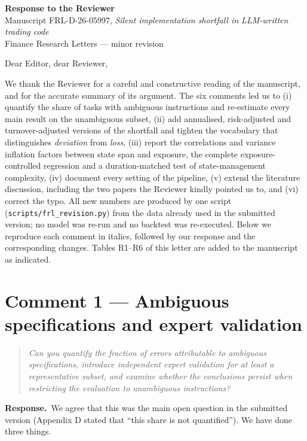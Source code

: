 \documentclass[11pt,a4paper]{article}
\newenvironment{reviewer}{\par\medskip\noindent\begin{quote}\itshape}{\end{quote}\par}
\newcommand{\response}{\par\noindent\textbf{Response.}\ }
\begin{document}
\begin{center}
{\large\bfseries Response to the Reviewer}\\[4pt]
Manuscript FRL-D-26-05997, \emph{Silent implementation shortfall in LLM-written trading code}\\
Finance Research Letters --- minor revision
\end{center}

\noindent Dear Editor, dear Reviewer,

\noindent We thank the Reviewer for a careful and constructive reading of the manuscript, and for the accurate summary of its argument. The six comments led us to (i) quantify the share of tasks with ambiguous instructions and re-estimate every main result on the unambiguous subset, (ii) add annualised, risk-adjusted and turnover-adjusted versions of the shortfall and tighten the vocabulary that distinguishes \emph{deviation} from \emph{loss}, (iii) report the correlations and variance inflation factors between state span and exposure, the complete exposure-controlled regression and a duration-matched test of state-management complexity, (iv) document every setting of the pipeline, (v) extend the literature discussion, including the two papers the Reviewer kindly pointed us to, and (vi) correct the typo. All new numbers are produced by one script (\texttt{scripts/frl\_revision.py}) from the data already used in the submitted version; no model was re-run and no backtest was re-executed. Below we reproduce each comment in italics, followed by our response and the corresponding changes. Tables R1--R6 of this letter are added to the manuscript as indicated.

\section*{Comment 1 --- Ambiguous specifications and expert validation}
\begin{reviewer}
Can you quantify the fraction of errors attributable to ambiguous specifications, introduce independent expert validation for at least a representative subset, and examine whether the conclusions persist when restricting the evaluation to unambiguous instructions?
\end{reviewer}

\response We agree that this was the main open question in the submitted version (Appendix D stated that ``this share is not quantified''). We have done three things.
\end{document}
